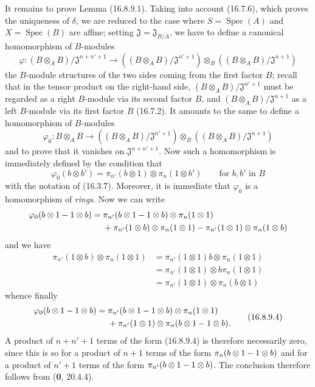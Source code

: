 It remains to prove Lemma (16.8.9.1). Taking into account (16.7.6), which
proves the uniqueness of $\delta$, we are reduced to the case where
$S=\operatorname{Spec}(A)$ and $X=\operatorname{Spec}(B)$ are affine; setting
$\mathfrak{J}=\mathfrak{J}_{B/A}$, we have to define a canonical
homomorphism of $B$-modules
\[
  \varphi:(B\otimes_A B)/\mathfrak{J}^{n+n'+1}
  \longrightarrow
  ((B\otimes_A B)/\mathfrak{J}^{n'+1})
  \otimes_B((B\otimes_A B)/\mathfrak{J}^{n+1})
\]
the $B$-module structures of the two sides coming from the first factor
$B$; recall that in the tensor product on the right-hand side,
$(B\otimes_A B)/\mathfrak{J}^{n'+1}$ must be regarded
as a right $B$-module via its second factor $B$, and
$(B\otimes_A B)/\mathfrak{J}^{n+1}$ as a left $B$-module via its first
factor $B$ (16.7.2). It amounts to the same to define a homomorphism of
$B$-modules
\[
  \varphi_0:B\otimes_A B\longrightarrow
  ((B\otimes_A B)/\mathfrak{J}^{n'+1})
  \otimes_B((B\otimes_A B)/\mathfrak{J}^{n+1})
\]
and to prove that it vanishes on $\mathfrak{J}^{n+n'+1}$. Now such a
homomorphism is immediately defined by the condition that
\[
  \varphi_0(b\otimes b')
  =\pi_{n'}(b\otimes1)\otimes\pi_n(1\otimes b')
  \qquad\text{for $b,b'$ in $B$}
\]
with the notation of (16.3.7). Moreover, it is immediate that $\varphi_0$ is
a homomorphism of \emph{rings}. Now we can write
\[
  \begin{aligned}
  \varphi_0(b\otimes1- 1\otimes b)
  ={}&\pi_{n'}(b\otimes1- 1\otimes b)\otimes\pi_n(1\otimes1)\\
  &+\pi_{n'}(1\otimes b)\otimes\pi_n(1\otimes1)
  -\pi_{n'}(1\otimes1)\otimes\pi_n(1\otimes b)
  \end{aligned}
\]
and we have
\[
  \begin{aligned}
  \pi_{n'}(1\otimes b)\otimes\pi_n(1\otimes1)
  &=\pi_{n'}(1\otimes1)b\otimes\pi_n(1\otimes1)\\
  &=\pi_{n'}(1\otimes1)\otimes b\pi_n(1\otimes1)\\
  &=\pi_{n'}(1\otimes1)\otimes\pi_n(b\otimes1)
  \end{aligned}
\]
whence finally
\[
  \begin{aligned}
  \varphi_0(b\otimes1- 1\otimes b)
  ={}&\pi_{n'}(b\otimes1- 1\otimes b)\otimes\pi_n(1\otimes1)\\
  &+\pi_{n'}(1\otimes1)\otimes\pi_n(b\otimes1- 1\otimes b).
  \end{aligned}
  \tag{16.8.9.4}
  \label{IV.16.8.9.4}
\]
A product of $n+n'+1$ terms of the form (16.8.9.4) is therefore
necessarily zero, since this is so for a product of $n+1$ terms of the
form $\pi_n(b\otimes1- 1\otimes b)$ and for a product of $n'+1$ terms of the
form $\pi_{n'}(b\otimes1- 1\otimes b)$. The conclusion therefore follows from
(\textbf{0}, 20.4.4).

